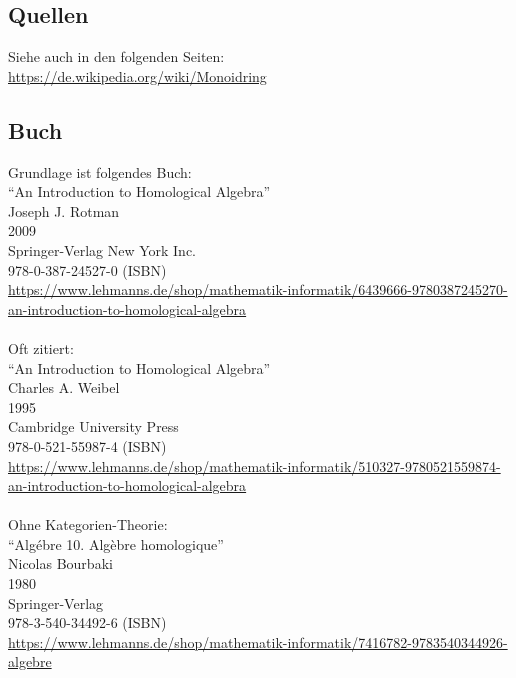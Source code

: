 \documentclass[a4paper]{amsart}
\theoremstyle{definition}
\begin{document}
\subsection*{Quellen}
Siehe auch in den folgenden Seiten:\\
\url{https://de.wikipedia.org/wiki/Monoidring}\\


\subsection*{Buch}
Grundlage ist folgendes Buch:\\
"`An Introduction to Homological Algebra"'\\
Joseph J. Rotman\\
2009\\
Springer-Verlag New York Inc.\\
978-0-387-24527-0 (ISBN)\\
{\tiny
   \url{https://www.lehmanns.de/shop/mathematik-informatik/6439666-9780387245270-an-introduction-to-homological-algebra}}\\
\\
Oft zitiert:\\
"`An Introduction to Homological Algebra"'\\
Charles A. Weibel\\
1995\\
Cambridge University Press\\
978-0-521-55987-4 (ISBN)\\
{\tiny
   \url{https://www.lehmanns.de/shop/mathematik-informatik/510327-9780521559874-an-introduction-to-homological-algebra}}\\
\\
Ohne Kategorien-Theorie:\\
"`Algébre 10. Algèbre homologique"'\\
Nicolas Bourbaki\\
1980\\
Springer-Verlag \\
978-3-540-34492-6 (ISBN)\\
{\tiny
   \url{https://www.lehmanns.de/shop/mathematik-informatik/7416782-9783540344926-algebre}}
\end{document}
